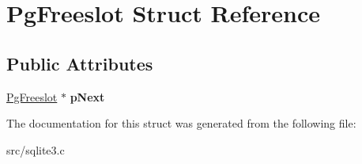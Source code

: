 \hypertarget{struct_pg_freeslot}{\section{Pg\-Freeslot Struct Reference}
\label{struct_pg_freeslot}
}
\subsection*{Public Attributes}
\begin{DoxyCompactItemize}
\item 
\hypertarget{struct_pg_freeslot_ac38a6e51f86c650fb943585d7b6c8b70}{\hyperlink{struct_pg_freeslot}{Pg\-Freeslot} $\ast$ {\bfseries p\-Next}}\label{struct_pg_freeslot_ac38a6e51f86c650fb943585d7b6c8b70}

\end{DoxyCompactItemize}


The documentation for this struct was generated from the following file\-:\begin{DoxyCompactItemize}
\item 
src/sqlite3.\-c\end{DoxyCompactItemize}
